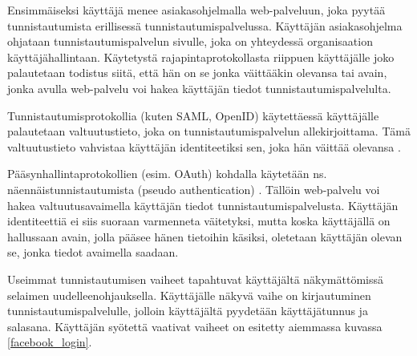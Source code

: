 Ensimmäiseksi käyttäjä menee asiakasohjelmalla web-palveluun, joka pyytää tunnistautumista erillisessä tunnistautumispalvelussa. Käyttäjän asiakasohjelma ohjataan tunnistautumispalvelun sivulle, joka on yhteydessä organisaation käyttäjähallintaan. Käytetystä rajapintaprotokollasta riippuen käyttäjälle joko palautetaan todistus siitä, että hän on se jonka väittääkin olevansa tai avain, jonka avulla web-palvelu voi hakea käyttäjän tiedot tunnistautumispalvelulta.

Tunnistautumisprotokollia (kuten SAML, OpenID) käytettäessä käyttäjälle palautetaan valtuutustieto, joka on tunnistautumispalvelun allekirjoittama. Tämä valtuutustieto vahvistaa käyttäjän identiteetiksi sen, joka hän väittää olevansa \cite{nisti}.

Pääsynhallintaprotokollien (esim. OAuth) kohdalla käytetään ns. näennäistunnistautumista (pseudo authentication) \cite{distributed_web_security}. Tällöin web-palvelu voi hakea valtuutusavaimella käyttäjän tiedot tunnistautumispalvelusta. Käyttäjän identiteettiä ei siis suoraan varmenneta väitetyksi, mutta koska käyttäjällä on hallussaan avain, jolla pääsee hänen tietoihin käsiksi, oletetaan käyttäjän olevan se, jonka tiedot avaimella saadaan.

Useimmat tunnistautumisen vaiheet tapahtuvat käyttäjältä näkymättömissä selaimen uudelleenohjauksella. Käyttäjälle näkyvä vaihe on kirjautuminen tunnistautumispalvelulle, jolloin käyttäjältä pyydetään käyttäjätunnus ja salasana. Käyttäjän syötettä vaativat vaiheet on esitetty aiemmassa kuvassa \ref{facebook_login}.